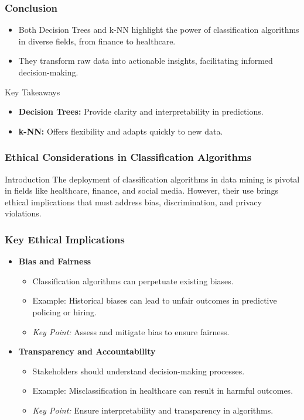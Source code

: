 \documentclass[aspectratio=169]{beamer}
\begin{document}
\begin{frame}
    \frametitle{Conclusion}
    \begin{itemize}
        \item Both Decision Trees and k-NN highlight the power of classification algorithms in diverse fields, from finance to healthcare. 
        \item They transform raw data into actionable insights, facilitating informed decision-making. 
    \end{itemize}
    
    \begin{block}{Key Takeaways}
        \begin{itemize}
            \item \textbf{Decision Trees:} Provide clarity and interpretability in predictions.
            \item \textbf{k-NN:} Offers flexibility and adapts quickly to new data.
        \end{itemize}
    \end{block}
\end{frame}

\begin{frame}[fragile]
    \frametitle{Ethical Considerations in Classification Algorithms}
    \begin{block}{Introduction}
        The deployment of classification algorithms in data mining is pivotal in fields like healthcare, finance, and social media. However, their use brings ethical implications that must address bias, discrimination, and privacy violations.
    \end{block}
\end{frame}

\begin{frame}[fragile]
    \frametitle{Key Ethical Implications}
    \begin{itemize}
        \item \textbf{Bias and Fairness}
            \begin{itemize}
                \item Classification algorithms can perpetuate existing biases.
                \item Example: Historical biases can lead to unfair outcomes in predictive policing or hiring.
                \item \textit{Key Point:} Assess and mitigate bias to ensure fairness.
            \end{itemize}

        \item \textbf{Transparency and Accountability}
            \begin{itemize}
                \item Stakeholders should understand decision-making processes.
                \item Example: Misclassification in healthcare can result in harmful outcomes.
                \item \textit{Key Point:} Ensure interpretability and transparency in algorithms.
            \end{itemize}
    \end{itemize}
\end{frame}
\end{document}
